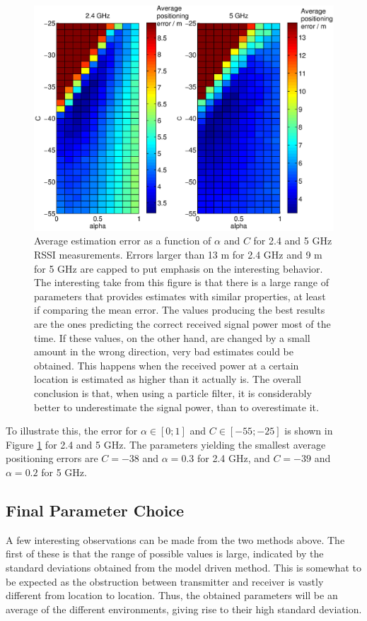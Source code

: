 \documentclass{LTHthesis}
\begin{document}
\begin{figure}[!hbt]

\includegraphics[width=1\textwidth ]{images/pure_rssi/err_vs_param}
\caption{Average estimation error as a function of $\alpha$ and $C$ for 2.4 and 5 GHz RSSI measurements. Errors larger than 13 m for 2.4 GHz and 9 m for 5 GHz are capped to put emphasis on the interesting behavior. The interesting take from this figure is that there is a large range of parameters that provides estimates with similar properties, at least if comparing the mean error. The values producing the best results are the ones predicting the correct received signal power most of the time. If these values, on the other hand, are changed by a small amount in the wrong direction, very bad estimates could be obtained. This happens when the received power at a certain location is estimated as higher than it actually is. The overall conclusion is that, when using a particle filter, it is considerably better to underestimate the signal power, than to overestimate it.}\label{err_vs_param}
\end{figure}
%
To illustrate this, the error for $\alpha \in [0;1]$ and $C \in [-55;-25]$ is shown in Figure \ref{err_vs_param} for 2.4 and 5 GHz. The parameters yielding the smallest average positioning errors are $C=-38$ and $\alpha = 0.3$ for 2.4 GHz, and $C=-39$ and $\alpha = 0.2$ for 5 GHz. 
%
\subsection{Final Parameter Choice}
%
A few interesting observations can be made from the two methods above. The first of these is that the range of possible values is large, indicated by the standard deviations obtained from the model driven method. This is somewhat to be expected as the obstruction between transmitter and receiver is vastly different from location to location. Thus, the obtained parameters will be an average of the different environments, giving rise to their high standard deviation. 
\end{document}
